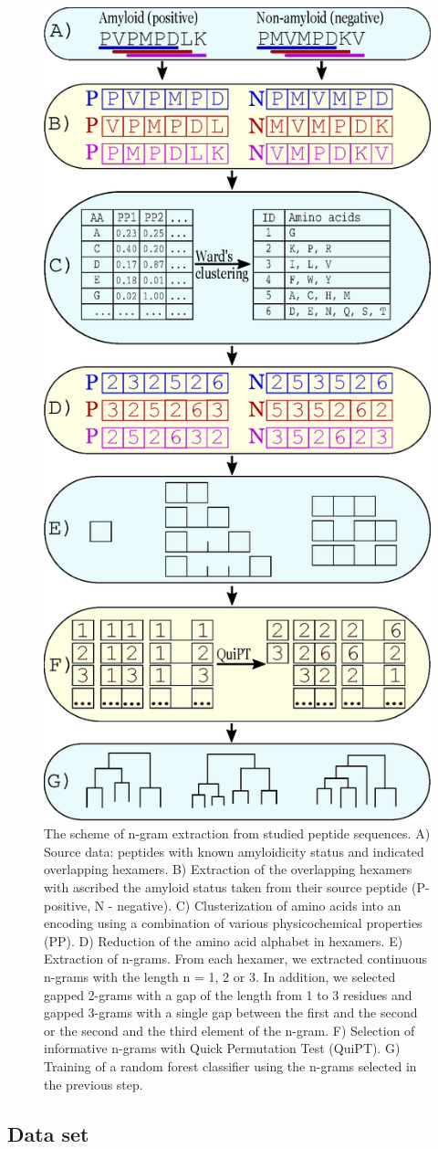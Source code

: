 \documentclass[fleqn,10pt,twoside]{gcb15submission}
\begin{document}
\begin{figure}[bth]
\centerline{\includegraphics[width=0.3\linewidth]{figures/ngram_scheme.eps}} 
\caption{The scheme of n-gram extraction from studied peptide sequences. 
A) Source data: peptides with known amyloidicity status and indicated 
overlapping hexamers. 
B) Extraction of the overlapping hexamers with ascribed the 
amyloid status taken from their source peptide (P-positive, N - 
negative). 
C) Clusterization of amino acids into an encoding using a combination of 
various 
physicochemical properties (PP). 
D) Reduction of the amino acid alphabet in hexamers. 
E) Extraction of n-grams. From each hexamer, we extracted continuous n-grams 
with the length n = 1, 2 or 3. In addition, we selected gapped 2-grams with a 
gap of the length from 1 to 3 residues and gapped 3-grams with a single gap 
between the first and the second or the second and the third element of the 
n-gram.
F) Selection of informative n-grams with Quick Permutation Test (QuiPT).
G) Training of a random forest classifier using the n-grams selected in the 
previous 
step.}\label{fig:ngram_scheme} 
\end{figure}

\subsection{Data set}
\end{document}
